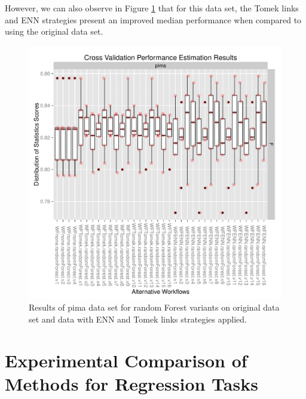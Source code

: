 \documentclass[10pt,a4paper]{article}\usepackage[]{graphicx}\usepackage[]{color}
\makeatletter
\def\maxwidth{ %
  \ifdim\Gin@nat@width>\linewidth
    \linewidth
  \else
    \Gin@nat@width
  \fi
}
\newenvironment{knitrout}{}{} %
\makeatother
\begin{document}
However, we can also observe in Figure \ref{fig:pima_plot2} that for this data set, the Tomek links and ENN strategies present an improved median performance when compared to using the original data set.  
\begin{knitrout}\footnotesize
{}\color{fgcolor}\begin{figure}

{\centering \includegraphics[width=\maxwidth]{figures/UBL-pima_plot2-1} 

}

\caption[Results of pima data set for random Forest variants on original data set and data with ENN and Tomek links strategies applied]{Results of pima data set for random Forest variants on original data set and data with ENN and Tomek links strategies applied.}\label{fig:pima_plot2}
\end{figure}


\end{knitrout}

\section{Experimental Comparison of Methods for Regression Tasks}
\end{document}
